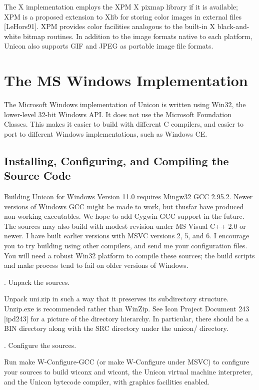 The X implementation employs the XPM X pixmap library if it is
available; XPM is a proposed extension to Xlib for storing color
images in external files [LeHors91]. XPM provides color facilities
analogous to the built-in X black-and-white bitmap routines. In
addition to the image formats native to each platform, Unicon also
supports GIF and JPEG as portable image file formats.

\section{The MS Windows Implementation}

The Microsoft Windows implementation of Unicon is written using Win32,
the lower-level 32-bit Windows API. It does not use the Microsoft
Foundation Classes. This makes it easier to build with different C
compilers, and easier to port to different Windows implementations,
such as Windows CE.

\subsection{Installing, Configuring, and Compiling the Source Code}

Building Unicon for Windows Version 11.0 requires Mingw32 GCC
2.95.2. Newer versions of Windows GCC might be made to work, but
thusfar have produced non-working executables. We hope to add Cygwin
GCC support in the future. The sources may also build with modest
revision under MS Visual C++ 2.0 or newer. I have built earlier
versions with MSVC versions 2, 5, and 6. I encourage you to try
building using other compilers, and send me your configuration
files. You will need a robust Win32 platform to compile these sources;
the build scripts and {\textquotedbl}make{\textquotedbl} process tend
to fail on older versions of Windows.

{. Unpack the sources.}

Unpack uni.zip in such a way that it preserves its subdirectory
structure. Unzip.exe is recommended rather than WinZip.  See Icon
Project Document 243 [ipd243] for a picture of the directory
hierarchy. In particular, there should be a BIN directory along with
the SRC directory under the unicon/ directory.

{. Configure the sources.}


Run {\textquotedbl}make W-Configure-GCC{\textquotedbl} (or
{\textquotedbl}make W-Configure{\textquotedbl} under MSVC) to
configure your sources to build wiconx and wicont, the Unicon virtual
machine interpreter, and the Unicon bytecode compiler, with graphics
facilities enabled.

